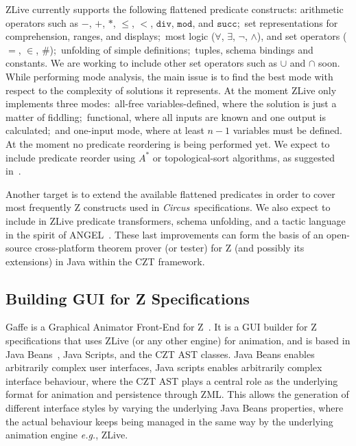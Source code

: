\documentclass{llncs}
\newcommand{\Circus}{{\sf\slshape Circus}}
\begin{document}
    ZLive currently supports the following flattened predicate constructs: arithmetic operators
    such as $-$, $+$, $*$, $\leq$, $<$, $\mathtt{div}$, $\mathtt{mod}$, and $\mathtt{succ}$;~set
    representations for comprehension, ranges, and displays;~most logic ($\forall$,
    $\exists$, $\lnot$, $\land$), and set operators ($=$, $\in$, $\#$);~unfolding of simple
    definitions;~tuples, schema bindings and constants.
    We are working to include other set operators such as $\cup$ and $\cap$ soon.
    While performing mode analysis, the main issue is to find the best mode with respect to
    the complexity of solutions it represents. At the moment ZLive only implements three modes:~all-free
    variables-defined, where the solution is just a matter of fiddling;~functional, where all inputs are known
    and one output is calculated;~and one-input mode, where at least $n-1$ variables must be defined.
    At the moment no predicate reordering is being performed yet.
    We expect to include predicate reorder using $A^*$ or topological-sort algorithms,
    as suggested in~\cite{winikooff98}.

    Another target is to extend the available flattened predicates in order to cover most
    frequently Z constructs used in \Circus\ specifications.
    We also expect to include in ZLive predicate transformers, schema unfolding, and a
    tactic language in the spirit of ANGEL~\cite{z.others:angel}.
    These last improvements can form the basis of an open-source cross-platform
    theorem prover (or tester) for Z (and possibly its extensions) in Java within
    the CZT framework.

\subsection{Building GUI for Z Specifications}

    Gaffe is a Graphical Animator Front-End for Z~\cite{daley2003}.
    It is a GUI builder for Z specifications that uses ZLive (or any other engine)
    for animation, and is based in Java Beans~\cite{javabeans}, Java Scripts, and the CZT AST classes.
    Java Beans enables arbitrarily complex user interfaces, Java scripts enables
    arbitrarily complex interface behaviour, where the CZT AST plays a central role as
    the underlying format for animation and persistence through ZML.
    This allows the generation of different interface styles by varying the underlying
    Java Beans properties, where the actual behaviour keeps being managed in the same way
    by the underlying animation engine \textit{e.g.}, ZLive.
\end{document}
